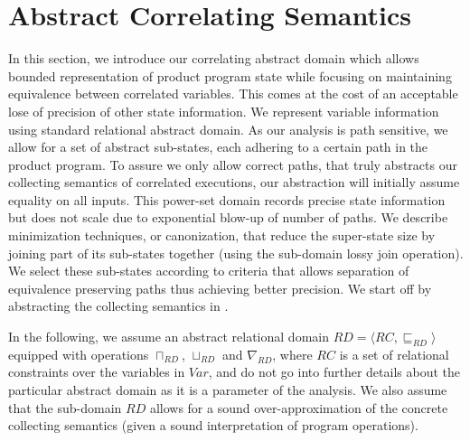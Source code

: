 \section{Abstract Correlating Semantics}

In this section, we introduce our correlating abstract domain which allows bounded representation of product program state while focusing on maintaining equivalence between correlated variables. This comes at the cost of an acceptable lose of precision of other state information. We represent variable information using standard relational abstract domain. As our analysis is path sensitive, we allow for a set of abstract sub-states, each adhering to a certain path in the product program. To assure we only allow correct paths, that truly abstracts our collecting semantics of correlated executions, our abstraction will initially assume equality on all inputs. This power-set domain records precise state information but does not scale due to exponential blow-up of number of paths. We describe minimization techniques, or canonization, that reduce the super-state size by joining part of its sub-states together (using the sub-domain lossy join operation). We select these sub-states according to criteria that allows separation of equivalence preserving paths thus achieving better precision. We start off by abstracting the collecting semantics in .

In the following, we assume an abstract relational domain $RD = \langle RC, \sqsubseteq_{RD} \rangle$ equipped with operations $\sqcap_{RD}$, $\sqcup_{RD}$ and $\nabla_{RD}$, where $RC$ is a set of relational constraints over the variables in $Var$, and do not go into further details about the particular abstract domain as it is a parameter of the analysis. We also assume that the sub-domain $RD$ allows for a sound over-approximation of the concrete collecting semantics (given a sound interpretation of program operations).

